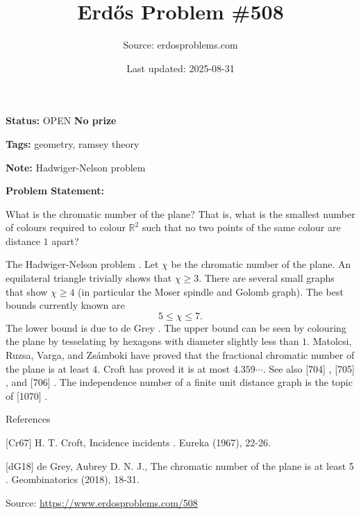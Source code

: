 \documentclass{article}
\title{Erd\H{o}s Problem \#508}
\date{Last updated: 2025-08-31}
\author{Source: erdosproblems.com}
\begin{document}
\maketitle

\noindent\textbf{Status:} OPEN \quad \textbf{No prize}

\noindent\textbf{Tags:} geometry, ramsey theory

\medskip
\noindent\textbf{Note:} Hadwiger-Nelson problem

\medskip

\noindent\textbf{Problem Statement:}

What is the chromatic number of the plane? That is, what is the smallest number of colours required to colour $\mathbb{R}^2$ such that no two points of the same colour are distance $1$ apart?




The Hadwiger-Nelson problem . Let $\chi$ be the chromatic number of the plane. An equilateral triangle trivially shows that $\chi\geq 3$. There are several small graphs that show $\chi\geq 4$ (in particular the Moser spindle and Golomb graph). The best bounds currently known are\[5 \leq \chi \leq 7.\]The lower bound is due to de Grey \cite{dG18}. The upper bound can be seen by colouring the plane by tesselating by hexagons with diameter slightly less than $1$. Matolcsi, Ruzsa, Varga, and Zs\'{a}mboki have proved that the fractional chromatic number of the plane is at least $4$. Croft \cite{Cr67} has proved it is at most $4.359\cdots$. See also [704] , [705] , and [706] . The independence number of a finite unit distance graph is the topic of [1070] .




References

[Cr67] H. T. Croft, Incidence incidents . Eureka (1967), 22-26.

[dG18] de Grey, Aubrey D. N. J., The chromatic number of the plane is at least 5 . Geombinatorics (2018), 18-31.


\bigskip
\noindent\small{Source: \url{https://www.erdosproblems.com/508}}
\end{document}
